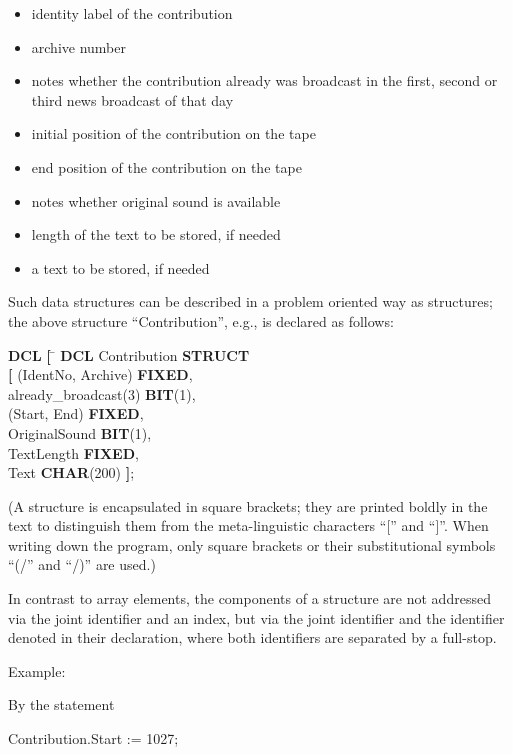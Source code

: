 \begin{itemize}
\item identity label of the contribution
\item archive number
\item notes whether the contribution already was broadcast in the first,
second or third news broadcast of that day
\item initial position of the contribution on the tape
\item end position of the contribution on the tape
\item notes whether original sound is available
\item length of the text to be stored, if needed
\item a text to be stored, if needed
\end{itemize}

Such data structures can be described in a problem oriented way as
structures; the above structure ``Contribution'', e.g., is declared as
follows:

\begin{tabbing}
{\bf DCL} \= {\bf [} \= \kill
{\bf DCL} \>         \> Contribution {\bf STRUCT} \\
          \> {\bf [} \> (IdentNo, Archive) {\bf FIXED},\\
          \>         \> already\_broadcast(3) {\bf BIT}(1),\\
          \>         \> (Start, End) {\bf FIXED},\\
          \>         \> OriginalSound {\bf BIT}(1),\\
          \>         \> TextLength {\bf FIXED},\\
          \>         \> Text {\bf CHAR}(200) {\bf ]};
\end{tabbing}

(A structure is encapsulated in square brackets; they are printed boldly in
the text to distinguish them from the meta-linguistic characters ``[''
and ``]''. When writing down the program, only square brackets or their
substitutional symbols ``(/'' and ``/)'' are used.)

In contrast to array elements, the components of a structure are not
addressed via the joint identifier and an index, but via the joint
identifier and the identifier denoted in their declaration, where both
identifiers are separated by a full-stop.

Example:

By the statement

Contribution.Start := 1027;


